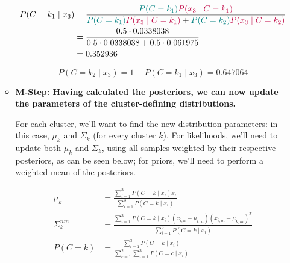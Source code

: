 \documentclass[12pt]{article}
\begin{document}
\begin{enumerate}[leftmargin=\labelsep]
\begin{itemize}[leftmargin=]
                \begin{equation*}
                  \begin{aligned}
                    P(C = k_1 \mid x_3) & = \frac{\textcolor{teal}{P(C = k_1)} \textcolor{purple}{P(x_3 \mid C = k_1)}}{\textcolor{teal}{P(C = k_1)} \textcolor{purple}{P(x_3 \mid C = k_1)} + \textcolor{teal}{P(C = k_2)} \textcolor{purple}{P(x_3 \mid C = k_2)}} \\
                                        & = \frac{0.5 \cdot 0.0338038}{0.5 \cdot 0.0338038 + 0.5 \cdot 0.061975}                                                                                                                                                     \\
                                        & = 0.352936
                  \end{aligned}
                \end{equation*}

                \begin{equation*}
                  P(C = k_2 \mid x_3) = 1 - P(C = k_1 \mid x_3) = 0.647064
                \end{equation*}

          \item \textbf{M-Step: Having calculated the posteriors, we can now
                  update the parameters of the cluster-defining distributions.}

                For each cluster, we'll want to find the new distribution parameters:
                in this case, $\mu_k$ and $\Sigma_k$ (for every cluster $k$).
                For likelihoods, we'll need to update both $\mu_k$ and $\Sigma_k$,
                using all samples weighted by their respective posteriors, as can be seen below;
                for priors, we'll need to perform a weighted mean of the posteriors.

                \begin{equation*}
                  \begin{aligned}
                    \mu_k         & = \frac{\sum_{i=1}^3 P(C = k \mid x_i) x_i}{\sum_{i=1}^3 P(C = k \mid x_i)}                                               \\
                    \Sigma_k^{nm} & = \frac{\sum_{i=1}^3 P(C = k \mid x_i) (x_{i, n} - \mu_{k, n}) (x_{i, m} - \mu_{k, m})^T}{\sum_{i=1}^3 P(C = k \mid x_i)} \\
                    P(C = k)      & = \frac{\sum_{i=1}^3 P(C = k \mid x_i)}{\sum_{c=1}^2\sum_{i=1}^3 P(C = c \mid x_i)}
                  \end{aligned}
                \end{equation*}


\end{itemize}
\end{enumerate}
\end{document}
